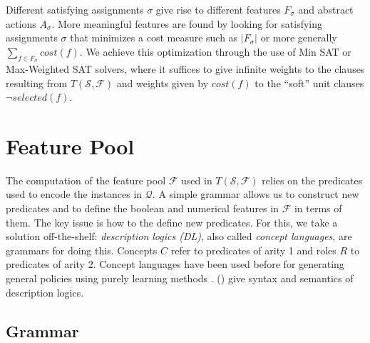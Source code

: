 \documentclass[letterpaper]{article} %
\newcommand{\Omit}[1]{}
\newcommand{\citeay}[1]{\citeauthor{#1} (\citeyear{#1})}
\newtheorem{theorem}[definition]{Theorem}
\newcommand{\Q}{\mathcal{Q}}
\newcommand{\F}{\mathcal{F}}
\renewcommand{\S}{\mathcal{S}}
\begin{document}
\Omit{
The goal expression $G_F$ can be provided explicitly  in terms of the primitive predicates,
but  more generally can be extracted  from the satisfying assigment $\sigma$ as well.
For this, $G_F = G_{\sigma}$ is defined as the DNF formula whose terms 
correspond to the abstract states over the selected features in $F_{\sigma}$ 
that are false in all expanded states in $\S$ marked as non-goals
and true in some expanded goal state. This DNF formula can   be simplified in standard ways. 
Due to  (\ref{eq:d1}) and (\ref{eq:goal}) that force the selected features in $F_{\sigma}$
to   distinguish goal  from non-goal states, we have that:

\begin{theorem}
For a satisfying assigment $\sigma$  of $T(\S,\F)$, 
$s$ is expanded goal   state in $\S$  iff  $s$ satisfies  $G_F=G_{\sigma}$.
\end{theorem}
}
% 
Different satisfying assignments $\sigma$ give rise to different features $F_{\sigma}$
and abstract actions $A_{\sigma}$. More meaningful features are found by looking for
satisfying assignments $\sigma$ that minimizes a cost measure such as $|F_{\sigma}|$
or more generally $\sum_{f \in F_{\sigma}} cost(f)$. We achieve this
optimization through the use of Min SAT or Max-Weighted SAT solvers, where it suffices
to give infinite weights to the clauses resulting from $T(\S,\F)$ and weights
given by $cost(f)$ to the ``soft'' unit clauses $\neg selected(f)$.


\section{Feature Pool}

The computation of the feature pool $\F$ used in $T(\S,\F)$
relies on the predicates used to encode the instances in $\Q$.
A simple grammar allows  us   to  construct new predicates 
and to define  the boolean and numerical features in $\F$
in terms of them. The key issue is how to the define
new predicates. For this, we take a solution off-the-shelf: \emph{description logics (DL)},  also called
\emph{concept languages},  are grammars for doing  this.
Concepts $C$  refer  to predicates of arity 1 and roles $R$  to predicates of arity 2.
Concept languages have been used before for  generating general policies using purely learning methods  \cite{martin:concept,fern:bias}.
\citeay{dl-handbook} give syntax and semantics of description logics.


\subsection{Grammar}
\end{document}
